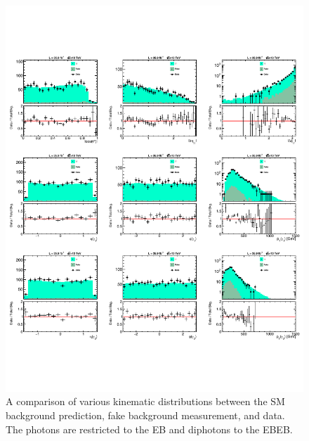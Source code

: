 \begin{figure}[!htbp]
	\centering
	\includegraphics[width=1.0\textwidth]{figures/kinematicSummary_EBEB_merged.pdf}
	\caption{A comparison of various kinematic distributions between the SM background prediction, fake background measurement, and data. The photons are restricted to the EB and diphotons to the EBEB.}
	\label{fig:kinematics_EBEB}
\end{figure}

